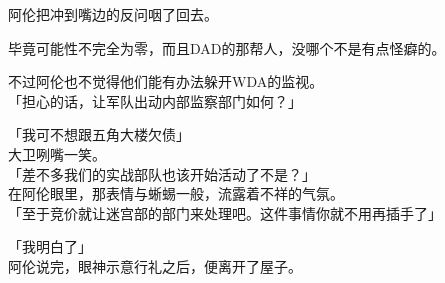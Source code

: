 阿伦把冲到嘴边的反问咽了回去。

毕竟可能性不完全为零，而且DAD的那帮人，没哪个不是有点怪癖的。

不过阿伦也不觉得他们能有办法躲开WDA的监视。\\

「担心的话，让军队出动内部监察部门如何？」

「我可不想跟五角大楼欠债」\\

大卫咧嘴一笑。\\

「差不多我们的实战部队也该开始活动了不是？」\\

在阿伦眼里，那表情与蜥蜴一般，流露着不祥的气氛。\\

「至于竞价就让迷宫部的部门来处理吧。这件事情你就不用再插手了」

「我明白了」\\

阿伦说完，眼神示意行礼之后，便离开了屋子。\\
